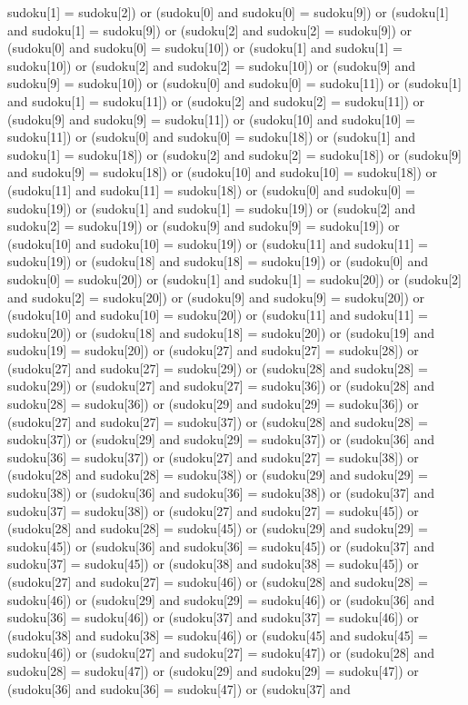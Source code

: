 \documentclass[8pt]{article}
\begin{document}
\begin{algorithm}[H]
sudoku[1] = sudoku[2]) or (sudoku[0]  and sudoku[0] = sudoku[9]) or (sudoku[1]  and sudoku[1] = sudoku[9]) or (sudoku[2]  and sudoku[2] = sudoku[9]) or (sudoku[0]  and sudoku[0] = sudoku[10]) or (sudoku[1]  and sudoku[1] = sudoku[10]) or (sudoku[2]  and sudoku[2] = sudoku[10]) or (sudoku[9]  and sudoku[9] = sudoku[10]) or (sudoku[0]  and sudoku[0] = sudoku[11]) or (sudoku[1]  and sudoku[1] = sudoku[11]) or (sudoku[2]  and sudoku[2] = sudoku[11]) or (sudoku[9]  and sudoku[9] = sudoku[11]) or (sudoku[10]  and sudoku[10] = sudoku[11]) or (sudoku[0]  and sudoku[0] = sudoku[18]) or (sudoku[1]  and sudoku[1] = sudoku[18]) or (sudoku[2]  and sudoku[2] = sudoku[18]) or (sudoku[9]  and sudoku[9] = sudoku[18]) or (sudoku[10]  and sudoku[10] = sudoku[18]) or (sudoku[11]  and sudoku[11] = sudoku[18]) or (sudoku[0]  and sudoku[0] = sudoku[19]) or (sudoku[1]  and sudoku[1] = sudoku[19]) or (sudoku[2]  and sudoku[2] = sudoku[19]) or (sudoku[9]  and sudoku[9] = sudoku[19]) or (sudoku[10]  and sudoku[10] = sudoku[19]) or (sudoku[11]  and sudoku[11] = sudoku[19]) or (sudoku[18]  and sudoku[18] = sudoku[19]) or (sudoku[0]  and sudoku[0] = sudoku[20]) or (sudoku[1]  and sudoku[1] = sudoku[20]) or (sudoku[2]  and sudoku[2] = sudoku[20]) or (sudoku[9]  and sudoku[9] = sudoku[20]) or (sudoku[10]  and sudoku[10] = sudoku[20]) or (sudoku[11]  and sudoku[11] = sudoku[20]) or (sudoku[18]  and sudoku[18] = sudoku[20]) or (sudoku[19]  and sudoku[19] = sudoku[20]) or (sudoku[27]  and sudoku[27] = sudoku[28]) or (sudoku[27]  and sudoku[27] = sudoku[29]) or (sudoku[28]  and sudoku[28] = sudoku[29]) or (sudoku[27]  and sudoku[27] = sudoku[36]) or (sudoku[28]  and sudoku[28] = sudoku[36]) or (sudoku[29]  and sudoku[29] = sudoku[36]) or (sudoku[27]  and sudoku[27] = sudoku[37]) or (sudoku[28]  and sudoku[28] = sudoku[37]) or (sudoku[29]  and sudoku[29] = sudoku[37]) or (sudoku[36]  and sudoku[36] = sudoku[37]) or (sudoku[27]  and sudoku[27] = sudoku[38]) or (sudoku[28]  and sudoku[28] = sudoku[38]) or (sudoku[29]  and sudoku[29] = sudoku[38]) or (sudoku[36]  and sudoku[36] = sudoku[38]) or (sudoku[37]  and sudoku[37] = sudoku[38]) or (sudoku[27]  and sudoku[27] = sudoku[45]) or (sudoku[28]  and sudoku[28] = sudoku[45]) or (sudoku[29]  and sudoku[29] = sudoku[45]) or (sudoku[36]  and sudoku[36] = sudoku[45]) or (sudoku[37]  and sudoku[37] = sudoku[45]) or (sudoku[38]  and sudoku[38] = sudoku[45]) or (sudoku[27]  and sudoku[27] = sudoku[46]) or (sudoku[28]  and sudoku[28] = sudoku[46]) or (sudoku[29]  and sudoku[29] = sudoku[46]) or (sudoku[36]  and sudoku[36] = sudoku[46]) or (sudoku[37]  and sudoku[37] = sudoku[46]) or (sudoku[38]  and sudoku[38] = sudoku[46]) or (sudoku[45]  and sudoku[45] = sudoku[46]) or (sudoku[27]  and sudoku[27] = sudoku[47]) or (sudoku[28]  and sudoku[28] = sudoku[47]) or (sudoku[29]  and sudoku[29] = sudoku[47]) or (sudoku[36]  and sudoku[36] = sudoku[47]) or (sudoku[37]  and 
\end{algorithm}
\end{document}
